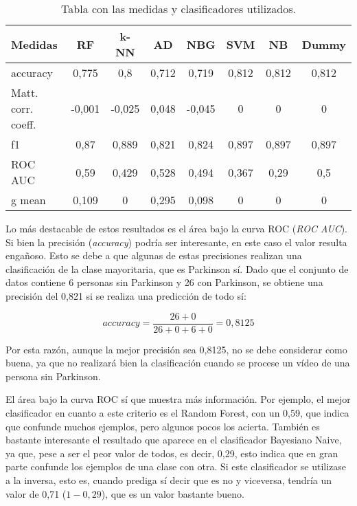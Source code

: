 \begin{table}[h]
	\begin{center}
		\begin{tabular}{ l c c c c c c c }
			\toprule
			\textbf{Medidas} & \textbf{RF} & \textbf{k-NN} & \textbf{AD} & \textbf{NBG} & \textbf{SVM} & \textbf{NB} & \textbf{Dummy} \\ \midrule
			accuracy & 0,775 & 0,8 & 0,712 & 0,719 & 0,812 & 0,812 & 0,812 \\
			Matt. corr. coeff. & -0,001 & -0,025 & 0,048 & -0,045 & 0 & 0 & 0 \\ 
			f1 & 0,87 & 0,889 & 0,821 & 0,824 & 0,897 & 0,897 & 0,897 \\
			ROC AUC & 0,59 & 0,429 & 0,528 & 0,494 & 0,367 & 0,29 & 0,5 \\
			g mean & 0,109 & 0 & 0,295 & 0,098 & 0 & 0 & 0 \\ \bottomrule
		\end{tabular}
		\caption{Tabla con las medidas y clasificadores utilizados.}
		\label{tab:medidas}
	\end{center}
\end{table}

Lo más destacable de estos resultados es el área bajo la curva ROC (\textit{ROC AUC}). Si bien la precisión (\textit{accuracy}) podría ser interesante, en este caso el valor resulta engañoso. Esto se debe a que algunas de estas precisiones realizan una clasificación de la clase mayoritaria, que es Parkinson sí. Dado que el conjunto de datos contiene 6 personas sin Parkinson y 26 con Parkinson, se obtiene una precisión del 0,821 si se realiza una predicción de todo sí:

\begin{equation}
	accuracy = \frac{26 + 0}{26 + 0 + 6 + 0} = 0,8125
\end{equation}

Por esta razón, aunque la mejor precisión sea 0,8125, no se debe considerar como buena, ya que no realizará bien la clasificación cuando se procese un vídeo de una persona sin Parkinson.

El área bajo la curva ROC sí que muestra más información. Por ejemplo, el mejor clasificador en cuanto a este criterio es el Random Forest, con un 0,59, que indica que confunde muchos ejemplos, pero algunos pocos los acierta. También es bastante interesante el resultado que aparece en el clasificador Bayesiano Naive, ya que, pese a ser el peor valor de todos, es decir, 0,29, esto indica que en gran parte confunde los ejemplos de una clase con otra. Si este clasificador se utilizase a la inversa, esto es, cuando prediga sí decir que es no y viceversa, tendría un valor de 0,71 ($1 - 0,29$), que es un valor bastante bueno.

